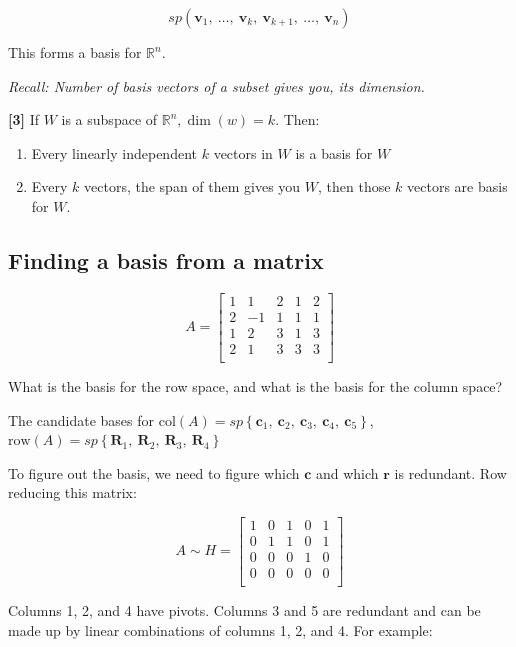 \documentclass[
]{article}
\newcounter{example}
\begin{document}
$$sp\left( {\mathbf{v}}_{1},\ \ldots,\ {\mathbf{v}}_{k},\ {\mathbf{v}}_{k + 1},\ \ldots,\ {\mathbf{v}}_{n} \right)$$

This forms a basis for $\mathbb{R}^{n}.$

\emph{Recall: Number of basis vectors of a subset gives you, its
dimension.}

\textbf{{[}3{]}} If $W$ is a subspace of
$\mathbb{R}^{n},\dim(w) = k$. Then:

\begin{enumerate}
\def\labelenumi{\alph{enumi})}
\item
  Every linearly independent $k$ vectors in $W$ is a basis for $W$
\item
  Every $k$ vectors, the span of them gives you $W$, then those
  $k$ vectors are basis for $W$.
\end{enumerate}


\subsection{Finding a basis from a
matrix}

$$A = \begin{bmatrix}
1 & 1 & 2 & 1 & 2 \\
2 & - 1 & 1 & 1 & 1 \\
1 & 2 & 3 & 1 & 3 \\
2 & 1 & 3 & 3 & 3 \\
\end{bmatrix}$$

What is the basis for the row space, and what is the basis for the
column space?

The candidate bases for
$\text{col}(A) = sp\left\{ {\mathbf{c}}_{1},\ {\mathbf{c}}_{2},\ {\mathbf{c}}_{3},\ {\mathbf{c}}_{4},\ {\mathbf{c}}_{5} \right\}$,
$\text{row}(A) = sp\left\{ {\mathbf{R}}_{1},\ {\mathbf{R}}_{2},\ {\mathbf{R}}_{3},\ {\mathbf{R}}_{4} \right\}$

To figure out the basis, we need to figure which $\mathbf{c}$ and
which $\mathbf{r}$ is redundant. Row reducing this matrix:

$$A\sim H = \begin{bmatrix}
1 & 0 & 1 & 0 & 1 \\
0 & 1 & 1 & 0 & 1 \\
0 & 0 & 0 & 1 & 0 \\
0 & 0 & 0 & 0 & 0 \\
\end{bmatrix}$$

Columns 1, 2, and 4 have pivots. Columns 3 and 5 are redundant and can
be made up by linear combinations of columns 1, 2, and 4. For example:
\end{document}
